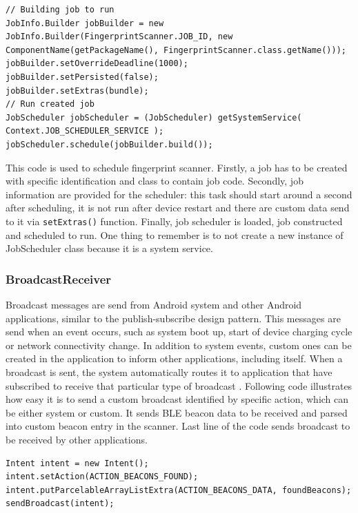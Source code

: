 \begin{lstlisting}[caption=Schedule Firngerprint scanner job.]
// Building job to run
JobInfo.Builder jobBuilder = new JobInfo.Builder(FingerprintScanner.JOB_ID, new ComponentName(getPackageName(), FingerprintScanner.class.getName()));
jobBuilder.setOverrideDeadline(1000);
jobBuilder.setPersisted(false);
jobBuilder.setExtras(bundle);
// Run created job
JobScheduler jobScheduler = (JobScheduler) getSystemService( Context.JOB_SCHEDULER_SERVICE );
jobScheduler.schedule(jobBuilder.build());
\end{lstlisting}

This code is used to schedule fingerprint scanner. Firstly, a job has to be created with specific identification and class to contain job code. Secondly, job information are provided for the scheduler: this task should start around a second after scheduling, it is not run after device restart and there are custom data send to it via \verb|setExtras()| function. Finally, job scheduler is loaded, job constructed and scheduled to run. One thing to remember is to not create a new instance of JobScheduler class because it is a system service.

\subsubsection{BroadcastReceiver}\label{subsubsec:BroadcastReceiver}
Broadcast messages are send from Android system and other Android applications, similar to the publish-subscribe design pattern. This messages are send when an event occurs, such as system boot up, start of device charging cycle or network connectivity change. In addition to system events, custom ones can be created in the application to inform other applications, including itself. When a broadcast is sent, the system automatically routes it to application that have subscribed to receive that particular type of broadcast \cite{AD}. Following code illustrates how easy it is to send a custom broadcast identified by specific action, which can be either system or custom. It sends BLE beacon data to be received and parsed into custom beacon entry in the scanner. Last line of the code sends broadcast to be received by other applications.

\begin{lstlisting}[caption=Send broadcast with BLE beacons found.]
Intent intent = new Intent();
intent.setAction(ACTION_BEACONS_FOUND);
intent.putParcelableArrayListExtra(ACTION_BEACONS_DATA, foundBeacons);
sendBroadcast(intent);
\end{lstlisting}


